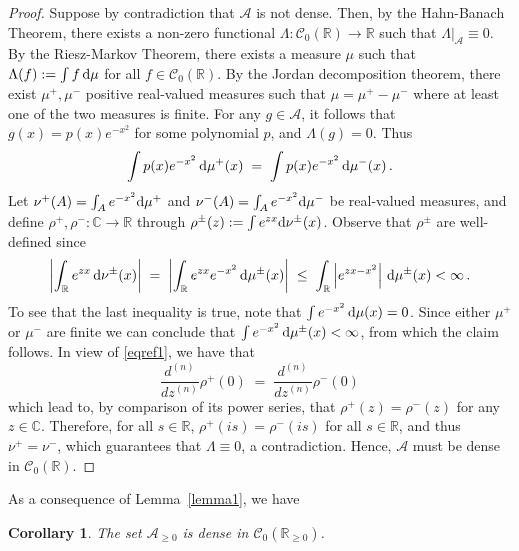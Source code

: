 \documentclass[12pt,a4paper]{article}
\theoremstyle{plain}
\newtheorem{corollary}[theorem]{Corollary}
\theoremstyle{remark}
\newcommand{\dd}{\text{\rm d}}
\newcommand{\mc}[1]{{\mathcal #1}}
\newcommand{\bb}[1]{{\mathbb #1}}
\newcommand{\mud}[1]{\left\lvert#1\right\rvert}
\begin{document}
	\begin{proof}
		Suppose by contradiction that $\mc{A}$ is not dense. Then, by the Hahn-Banach Theorem, there exists a non-zero functional $\Lambda : \mc{C}_0(\bb R) \to \bb{R}$ such that $\Lambda\vert_{\mc{A}} \equiv 0$. By the Riesz-Markov Theorem, there exists a measure $\mu$ such that
		$\Lambda(f):=\int f \,\dd\mu$ 	for all $f\in\mc{C}_0(\bb R)$.
		By the Jordan decomposition theorem, there exist $\mu^+,\mu^-$ positive real-valued measures such that $\mu = \mu^+ - \mu^-$ where at least one of the two measures is finite.
		For any $g \in \mc{A}$, it follows that $g(x) = p(x)e^{-x^2}$ for some polynomial $p$, and $\Lambda(g) = 0$. Thus
		\begin{equation}\label{eqref1}
			\int p(x)e^{-x^2}\,\dd\mu^+(x)\;=\;\int p(x)e^{-x^2}\,\dd\mu^-(x)\,.
		\end{equation}
		Let $\nu^+(A) = \int_A e^{-x^2} \dd\mu^+$ and  $\nu^-(A) = \int_A e^{-x^2} \dd\mu^-$ be real-valued measures, and define $\rho^+, \rho^- : \bb{C} \to \bb{R}$ through $\rho^\pm(z) := \int e^{zx} \dd\nu^\pm(x)$. Observe that $\rho^\pm$ are well-defined since
		\begin{equation*}
			\mud{\int_{\bb{R}} e^{zx}\,\dd\nu^\pm(x)}\;=\;\mud{\int_{\bb{R}} e^{zx}e^{-x^2}\,\dd\mu^\pm(x)}\;\leq\;\int_{\bb{R}} \mud{e^{zx - x^2}}\,\dd\mu^\pm(x)<\infty\,.
		\end{equation*}
		To see that the last inequality is true, note that
		$\int e^{-x^2}\,\dd \mu(x)=0$.
		Since either $\mu^{+}$ or $\mu^{-}$ are finite we can conclude that
		$	\int e^{-x^2}\,\dd \mu^\pm(x)<\infty$,
		from which the claim follows.
		In view of  \eqref{eqref1}, we have that
		\begin{equation*}
			\frac{d^{(n)}}{dz^{(n)}}\rho^+(0)\; =\; \frac{d^{(n)}}{dz^{(n)}}\rho^-(0)
		\end{equation*}
		which lead to, by comparison of its power series, that $\rho^+(z) = \rho^-(z)$ for any $z \in \bb{C}$. Therefore, for all $s \in \bb{R}$, $\rho^+(is) = \rho^-(is)$ for all $s \in \bb{R}$, and thus $\nu^+ = \nu^-$, which guarantees that $\Lambda \equiv 0$, a  contradiction. Hence, $\mc{A}$ must be dense in $\mc{C}_0(\bb R)$.
	\end{proof}
	As a consequence of Lemma~\ref{lemma1}, we have
	\begin{corollary}\label{cor:3.2}
		The set 	$\mc{A}_{\geq 0}$ is dense in $\mc{C}_0(\bb R_{\geq 0})$.
	\end{corollary}
	
	
	
\end{document}

